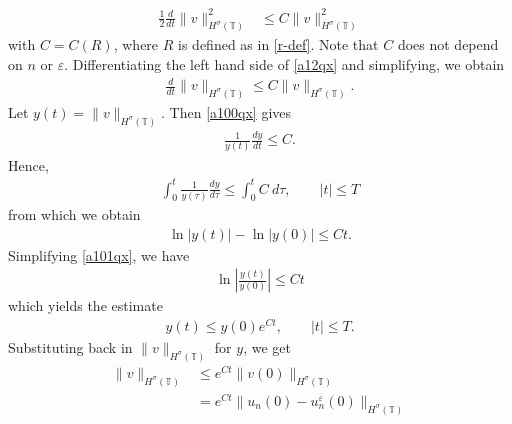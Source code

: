 \documentclass[12pt,reqno]{amsart}
\newcommand{\ci}{\mathbb{T}}
\newcommand{\ee}{\varepsilon}
\theoremstyle{plain}  %
\theoremstyle{definition}
\begin{document}
\begin{appendices}
\begin{equation}
\begin{split}
		\frac{1}{2}\frac{d}{dt} \|v\|_{H^{\sigma}(\ci)}^2
		& \le
	C \|v\|_{H^{\sigma}(\ci)}^2
\end{split}
\end{equation}
with $C = C(R)$, where $R$ is defined as in \eqref{r-def}. Note that $C$
does not depend on $n$ or $\ee$. Differentiating
the left hand side of \eqref{a12qx} and simplifying, we obtain
\begin{equation}
	\begin{split}
		\frac{d}{dt}\|v\|_{H^{\sigma}(\ci)} \le C \|v\|_{H^{\sigma}(\ci)}.
		\label{a100qx}
	\end{split}
\end{equation}
Let $y(t) = \|v\|_{H^{\sigma}(\ci)}$. Then \eqref{a100qx} gives
\begin{equation*}
	\begin{split}
		\frac{1}{y(t)}\frac{dy}{dt} \le C.
	\end{split}
\end{equation*}
Hence,
\begin{equation*}
	\begin{split}
		\int_0^t \frac{1}{y(\tau)} \frac{dy}{d \tau}
		\le \int_0^t C \ d \tau, \qquad |t| \le T
	\end{split}
\end{equation*}
from which we obtain
\begin{equation}
	\begin{split}
		\ln |y(t) | - \ln |y(0)| \le C t.
		\label{a101qx}
	\end{split}
\end{equation}
Simplifying \eqref{a101qx}, we have
\begin{equation*}
	\begin{split}
		\ln \left |\frac{y(t)}{y(0)} \right | \le C t
	\end{split}
\end{equation*}
which yields the estimate
\begin{equation*}
	\begin{split}
		y(t) \le y(0) e^{C t}, \qquad |t| \le T.
	\end{split}
\end{equation*}
Substituting back in $\|v\|_{H^{\sigma}(\ci)}$ for $y$, we get
\begin{equation}
	\label{vsig-est}
	\begin{split}
		\|v\|_{H^{\sigma}(\ci)}
		& \le e^{C t}\|v(0)\|_{H^{\sigma}(\ci)}
		\\
		& = e^{C t}\|u_n(0) - u^\ee_n(0) \|_{H^{\sigma}(\ci)}
		\\

\end{split}
\end{equation}
\end{appendices}
\end{document}
